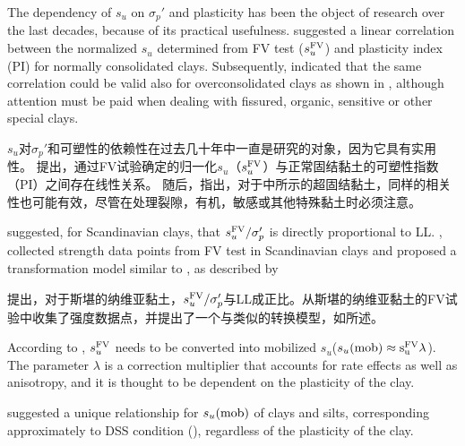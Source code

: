 \begin{ParaColumn}
    \switchcolumn*

    The dependency of $s_u$ on $\sigma_p'$ and plasticity has been the object of research over the last decades, because of its practical usefulness. \citet{Skempton195419} suggested a linear correlation between the normalized $s_u$ determined from FV test ($s_u^{\rm{FV}}$) and plasticity index (PI) for normally consolidated clays. Subsequently, \citet{Chandler198813} indicated that the same correlation could be valid also for overconsolidated clays as shown in , although attention must be paid when dealing with fissured, organic, sensitive or other special clays.

    \switchcolumn

    $s_u$对$\sigma_p'$和可塑性的依赖性在过去几十年中一直是研究的对象，因为它具有实用性。 \citet{Skempton195419}提出，通过FV试验确定的归一化$s_u$（$s_u^{\rm{FV}}$）与正常固结黏土的可塑性指数（PI）之间存在线性关系。 随后，\citet{Chandler198813}指出，对于中所示的超固结黏土，同样的相关性也可能有效，尽管在处理裂隙，有机，敏感或其他特殊黏土时必须注意。

    \switchcolumn*

    \citet{Hansbo1957}suggested, for Scandinavian clays, that $s_u^{\rm{FV}}/\sigma_p'$ is directly proportional to LL. \citet{Larsson1980591}, collected strength data points from FV test in Scandinavian clays and proposed a transformation model similar to , as described by 

    \switchcolumn

    \citet{Hansbo1957}提出，对于斯堪的纳维亚黏土，$s_u^{\rm{FV}}/\sigma_p'$与LL成正比。\citet{Larsson1980591}从斯堪的纳维亚黏土的FV试验中收集了强度数据点，并提出了一个与类似的转换模型，如所述。

    \switchcolumn*

    According to \citet{Bjerrum19721}, $s_u^{\rm{FV}}$ needs to be converted into mobilized $s_u$($s_u(\rm{mob})\approx{}s_u^{\rm{FV}}\lambda$). The parameter $\lambda$ is a correction multiplier that accounts for rate effects as well as anisotropy, and it is thought to be dependent on the plasticity of the clay.
    
    \citet{Mesri1975409,Mesri1989162} suggested a unique relationship for $s_u(\rm{mob})$ of clays and silts, corresponding approximately to DSS condition (), regardless of the plasticity of the clay.


\end{ParaColumn}
